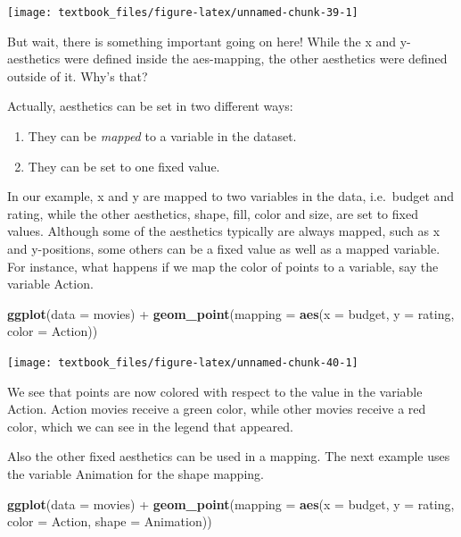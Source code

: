\documentclass[]{tufte-book}
\newenvironment{Shaded}{}{}
\newcommand{\DataTypeTok}[1]{\textcolor[rgb]{0.56,0.13,0.00}{#1}}
\newcommand{\KeywordTok}[1]{\textcolor[rgb]{0.00,0.44,0.13}{\textbf{#1}}}
\newcommand{\NormalTok}[1]{#1}
\newcommand{\OperatorTok}[1]{\textcolor[rgb]{0.40,0.40,0.40}{#1}}
\newcommand{\StringTok}[1]{\textcolor[rgb]{0.25,0.44,0.63}{#1}}
\providecommand{\tightlist}{%
  \setlength{\itemsep}{0pt}\setlength{\parskip}{0pt}}
\begin{document}
\texttt{[image: textbook\_files/figure-latex/unnamed-chunk-39-1]}

But wait, there is something important going on here! While the x and y-aesthetics were defined inside the aes-mapping, the other aesthetics were defined outside of it. Why's that?

Actually, aesthetics can be set in two different ways:

\begin{enumerate}
\def\labelenumi{\arabic{enumi}.}
\tightlist
\item
  They can be \emph{mapped} to a variable in the dataset.
\item
  They can be set to one fixed value.
\end{enumerate}

In our example, x and y are mapped to two variables in the data, i.e.~budget and rating, while the other aesthetics, shape, fill, color and size, are set to fixed values. Although some of the aesthetics typically are always mapped, such as x and y-positions, some others can be a fixed value as well as a mapped variable. For instance, what happens if we map the color of points to a variable, say the variable Action.

\begin{Shaded}
\begin{Highlighting}[]
\KeywordTok{ggplot}\NormalTok{(}\DataTypeTok{data =}\NormalTok{ movies) }\OperatorTok{+}
\StringTok{    }\KeywordTok{geom_point}\NormalTok{(}\DataTypeTok{mapping =} \KeywordTok{aes}\NormalTok{(}\DataTypeTok{x =}\NormalTok{ budget, }
                             \DataTypeTok{y =}\NormalTok{ rating, }
                             \DataTypeTok{color =}\NormalTok{ Action))}
\end{Highlighting}
\end{Shaded}

\texttt{[image: textbook\_files/figure-latex/unnamed-chunk-40-1]}

We see that points are now colored with respect to the value in the variable Action. Action movies receive a green color, while other movies receive a red color, which we can see in the legend that appeared.

Also the other fixed aesthetics can be used in a mapping. The next example uses the variable Animation for the shape mapping.

\begin{Shaded}
\begin{Highlighting}[]
\KeywordTok{ggplot}\NormalTok{(}\DataTypeTok{data =}\NormalTok{ movies) }\OperatorTok{+}
\StringTok{    }\KeywordTok{geom_point}\NormalTok{(}\DataTypeTok{mapping =} \KeywordTok{aes}\NormalTok{(}\DataTypeTok{x =}\NormalTok{ budget, }
                             \DataTypeTok{y =}\NormalTok{ rating, }
                             \DataTypeTok{color =}\NormalTok{ Action, }
                              \DataTypeTok{shape =}\NormalTok{ Animation))}
\end{Highlighting}
\end{Shaded}
\end{document}
